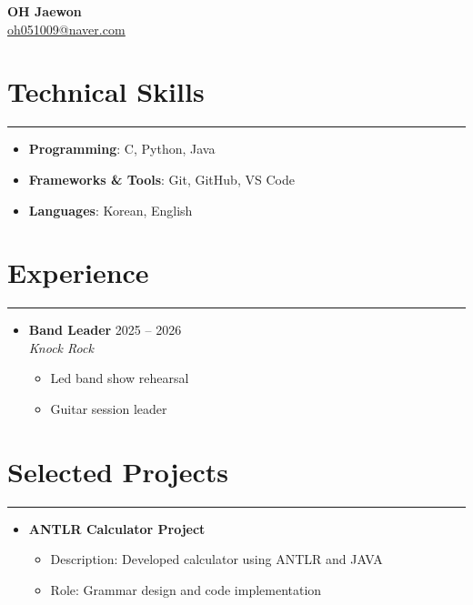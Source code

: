 \documentclass[letterpaper,10pt]{article}
\begin{document}
\begin{center}
    \textbf{\LARGE OH Jaewon} \\
    \vspace{2pt}
    \href{mailto:oh051009@naver.com}
    {\underline{oh051009@naver.com}}
\end{center}

\section*{Technical Skills}
\hrule
\vspace{4pt}

\begin{itemize}
    \item[] \textbf{Programming}: C, Python, Java
    \item[] \textbf{Frameworks \& Tools}: Git, GitHub, VS Code
    \item[] \textbf{Languages}: Korean, English
\end{itemize}

\section*{Experience}
\hrule
\vspace{4pt}

\begin{itemize}
    \item[]
    \textbf{Band Leader} \hfill 2025 -- 2026 \\
    \textit{Knock Rock}
    \begin{itemize}
        \item Led band show rehearsal
        \item Guitar session leader
    \end{itemize}
\end{itemize}

\section*{Selected Projects}
\hrule
\vspace{4pt}

\begin{itemize}
    \item \textbf{ANTLR Calculator Project}
    \begin{itemize}
        \item Description: Developed calculator using ANTLR and JAVA
        \item Role: Grammar design and code implementation 
    \end{itemize}
\end{itemize}
\end{document}
